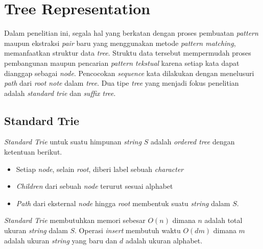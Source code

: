 \section{Tree Representation} 
Dalam penelitian ini, segala hal yang berkatan dengan proses pembuatan \textit{pattern} maupun ekstraksi \textit{pair} baru yang menggunakan metode \textit{pattern matching}, memanfaatkan struktur data \textit{tree}. Struktu data tersebut mempermudah proses pembangunan maupun pencarian \textit{pattern tekstual} karena setiap kata dapat dianggap sebagai \textit{node}. Pencocokan \textit{sequence} kata dilakukan dengan menelusuri \textit{path} dari \textit{root note} dalam \textit{tree}. Dua tipe \textit{tree} yang menjadi fokus penelitian adalah \textit{standard trie} dan \textit{suffix tree}.

\subsection{Standard Trie} \label{sec:trie}
\textit{Standard Trie} untuk suatu himpunan \textit{string} $S$ adalah \textit{ordered tree} dengan ketentuan berikut.
\begin{itemize}
  \item Setiap \textit{node}, selain \textit{root}, diberi label sebuah \textit{character}
  \item \textit{Children} dari sebuah \textit{node} terurut sesuai alphabet
  \item \textit{Path} dari eksternal \textit{node} hingga \textit{root} membentuk suatu \textit{string} dalam $S$.
\end{itemize}
\textit{Standard Trie} membutuhkan memori sebesar $O(n)$ dimana $n$ adalah total ukuran \textit{string} dalam $S$. Operasi \textit{insert} membutuh waktu $O(dm)$ dimana $m$ adalah ukuran \textit{string} yang baru dan $d$ adalah ukuran alphabet.

